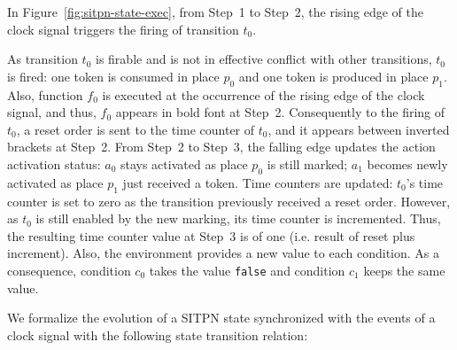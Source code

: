 In Figure~\ref{fig:sitpn-state-exec}, from Step~1 to Step~2, the
rising edge of the clock signal triggers the firing of transition
$t_0$. %



As transition $t_0$ is firable and is not in effective conflict with
other transitions, $t_0$ is fired: one token is consumed in place
$p_0$ and one token is produced in place $p_1$. Also, function $f_0$
is executed at the occurrence of the rising edge of the clock signal,
and thus, $f_0$ appears in bold font at Step~2. Consequently to the
firing of $t_0$, a reset order is sent to the time counter of $t_0$,
and it appears between inverted brackets at Step~2. From Step~2 to
Step~3, the falling edge updates the action activation status: $a_0$
stays activated as place $p_0$ is still marked; $a_1$ becomes newly
activated as place $p_1$ just received a token. Time counters are
updated: $t_0$'s time counter is set to zero as the transition
previously received a reset order. However, as $t_0$ is still enabled
by the new marking, its time counter is incremented. Thus, the
resulting time counter value at Step~3 is of one (i.e. result of reset
plus increment). Also, the environment provides a new value to each
condition. As a consequence, condition $c_0$ takes the value
\texttt{false} and condition $c_1$ keeps the same value.

We formalize the evolution of a SITPN state synchronized with the
events of a clock signal with the following state transition relation:

